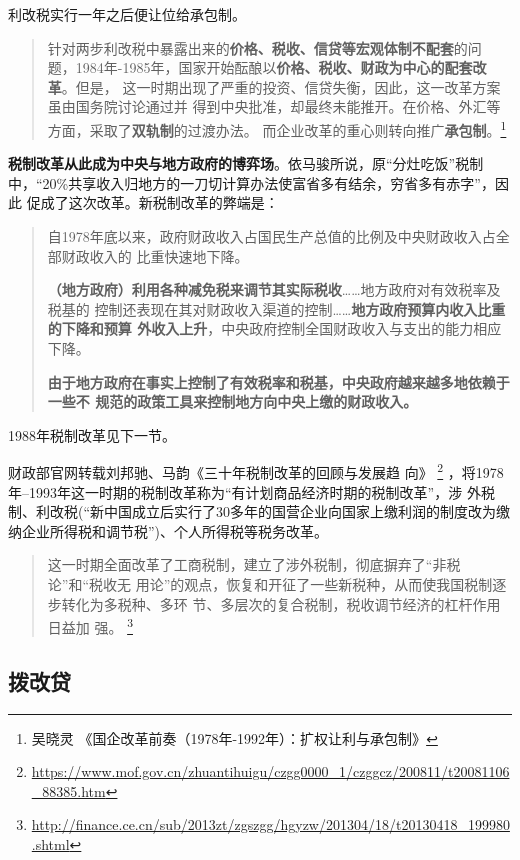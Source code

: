 利改税实行一年之后便让位给承包制。
\begin{quotation}
  针对两步利改税中暴露出来的\textbf{价格、税收、信贷等宏观体制不配套}的问
  题，1984年-1985年，国家开始酝酿以\textbf{价格、税收、财政为中心的配套改革}。但是，
  这一时期出现了严重的投资、信贷失衡，因此，这一改革方案虽由国务院讨论通过并
  得到中央批准，却最终未能推开。在价格、外汇等方面，采取了\textbf{双轨制}的过渡办法。
  而企业改革的重心则转向推广\textbf{承包制}。\footnote{吴晓灵 《国企改革前奏（1978年-1992年）：扩权让利与承包制》}
\end{quotation}


\textbf{税制改革从此成为中央与地方政府的博弈场}。依马骏所说，原“分灶吃饭”税制
中，“20\%共享收入归地方的一刀切计算办法使富省多有结余，穷省多有赤字”，因此
促成了这次改革。新税制改革的弊端是：
\begin{quotation}
  自1978年底以来，政府财政收入占国民生产总值的比例及中央财政收入占全部财政收入的
  比重快速地下降。

  \textbf{（地方政府）利用各种减免税来调节其实际税收}……地方政府对有效税率及税基的
  控制还表现在其对财政收入渠道的控制……\textbf{地方政府预算内收入比重的下降和预算
    外收入上升}，中央政府控制全国财政收入与支出的能力相应下降。

  \textbf{由于地方政府在事实上控制了有效税率和税基，中央政府越来越多地依赖于一些不
    规范的政策工具来控制地方向中央上缴的财政收入。}\cite{majuncaigai}
\end{quotation}

1988年税制改革见下一节。

财政部官网转载刘邦驰、马韵《三十年税制改革的回顾与发展趋
向》
\footnote{\url{https://www.mof.gov.cn/zhuantihuigu/czgg0000_1/czggcz/200811/t20081106_88385.htm}}
，将1978年--1993年这一时期的税制改革称为“有计划商品经济时期的税制改革”，涉
外税制、利改税(“新中国成立后实行了30多年的国营企业向国家上缴利润的制度改为缴
纳企业所得税和调节税”)、个人所得税等税务改革。
\begin{quotation}
  这一时期全面改革了工商税制，建立了涉外税制，彻底摒弃了“非税论”和“税收无
  用论”的观点，恢复和开征了一些新税种，从而使我国税制逐步转化为多税种、多环
  节、多层次的复合税制，税收调节经济的杠杆作用日益加
  强。
  \footnote{\url{http://finance.ce.cn/sub/2013zt/zgszgg/hgyzw/201304/18/t20130418_199980.shtml}}
\end{quotation}

\subsection{拨改贷}

